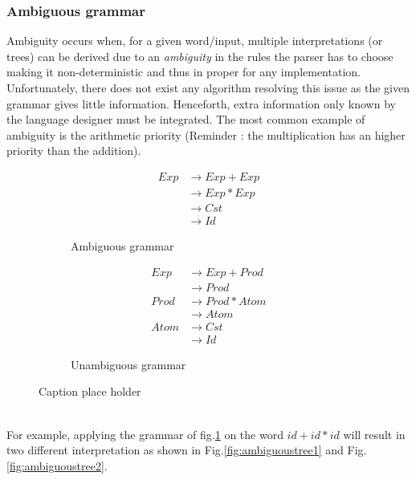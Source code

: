 \documentclass[a4paper,11pt]{article}
\begin{document}
      \subsubsection{Ambiguous grammar}
        Ambiguity occurs when, for a given word/input, multiple interpretations (or trees) can be derived due to an \textit{ambiguity} in the rules the parser has to choose making it non-deterministic and thus in proper for any implementation. Unfortunately, there does not exist any algorithm resolving this issue as the given grammar gives little information. Henceforth, extra information only known by the language designer must be integrated. The most common example of ambiguity is the arithmetic priority (Reminder : the multiplication has an higher priority than the addition).
        \begin{figure}[h!]
          \centering
          \begin{subfigure}[b]{0.4\textwidth}
              \centering
              \begin{align}
                Exp &\rightarrow Exp+Exp \\
                    &\rightarrow Exp*Exp \\
                    &\rightarrow Cst \\
                    &\rightarrow Id
              \end{align}
              \caption{Ambiguous grammar}
              \label{fig:unmodifiedgrammar3}
          \end{subfigure}%
          \begin{subfigure}[b]{0.4\textwidth}
              \centering
              \begin{align}
                Exp  &\rightarrow Exp+Prod \\
                     &\rightarrow Prod \\
                Prod &\rightarrow Prod*Atom \\
                     &\rightarrow Atom \\
                Atom &\rightarrow Cst \\
                     &\rightarrow Id
              \end{align}
              \caption{Unambiguous grammar}
              \label{fig:unambiguousgrammar3}
          \end{subfigure}
          \caption{Caption place holder}
	\end{figure}\\
      For example, applying the grammar of fig.\ref{fig:unmodifiedgrammar3} on the word $id+id*id$ will result in two different interpretation as shown in Fig.\ref{fig:ambiguoustree1} and Fig.\ref{fig:ambiguoustree2}.
      
\end{document}
